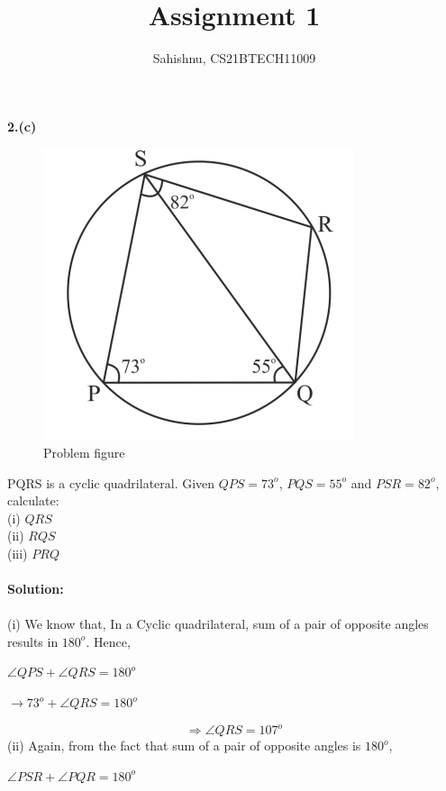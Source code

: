 \documentclass[8pt, twocolumn]{article}
\title{Assignment 1}
\author{Sahishnu, CS21BTECH11009}
\date{}
\begin{document}
\maketitle
\textbf {2.(c)}\\
\begin{center}
\begin{figure}
    \centering
    \includegraphics[scale=0.5]{figs/fig1.png}
    \caption{Problem figure}
    \label{fig:my_label}
\end{figure}

\end{center}
PQRS is a cyclic quadrilateral. Given \angle $QPS=73^o$, \angle $PQS=55^o$ and \angle $PSR=82^o$, calculate:\\
(i) \angle $QRS$\\
(ii) \angle $RQS$\\
(iii) \angle $PRQ$\\\\
\textbf {Solution: }\\\\
(i) We know that, In a Cyclic quadrilateral, sum of a pair of opposite angles results in $180^o$.
Hence,
\begin{center}
   $\angle QPS + \angle QRS = 180^o$
\end{center}
\begin{center}
$\rightarrow 73^o + \angle QRS = 180^o$
\end{center}
\begin{equation}
    \Rightarrow \angle QRS = 107^o
\end{equation}
(ii) Again, from the fact that sum of a pair of opposite angles is $180^o$,
\begin{center}
    $\angle PSR + \angle PQR = 180^o$
\end{center}
\end{document}
